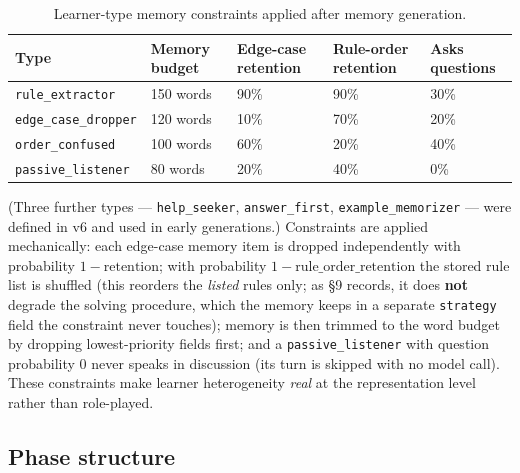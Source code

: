 \documentclass[11pt]{article}
\begin{document}
\begin{table}[h]
\centering
\caption{Learner-type memory constraints applied after memory generation.}
\label{tab:learner-types}
\begin{tabular}{@{}lp{2.0cm}p{2.3cm}p{2.3cm}p{1.9cm}@{}}
\toprule
Type & Memory budget & Edge-case retention & Rule-order retention & Asks questions \\
\midrule
\texttt{rule\_extractor}    & 150 words & 90\% & 90\% & 30\% \\
\texttt{edge\_case\_dropper} & 120 words & 10\% & 70\% & 20\% \\
\texttt{order\_confused}     & 100 words & 60\% & 20\% & 40\% \\
\texttt{passive\_listener}   &  80 words & 20\% & 40\% &  0\% \\
\bottomrule
\end{tabular}
\end{table}

(Three further types --- \texttt{help\_seeker}, \texttt{answer\_first},
\texttt{example\_memorizer} --- were defined in v6 and used in early generations.)
Constraints are applied mechanically: each edge-case memory item is dropped
independently with probability $1 - \text{retention}$; with probability $1 -
\text{rule\_order\_retention}$ the stored rule list is shuffled (this reorders the
\emph{listed} rules only; as \S9 records, it does \textbf{not} degrade the solving
procedure, which the memory keeps in a separate \texttt{strategy} field the
constraint never touches); memory is then trimmed to the word budget by dropping
lowest-priority fields first; and a \texttt{passive\_listener} with question
probability 0 never speaks in discussion (its turn is skipped with no model call).
These constraints make learner heterogeneity \emph{real} at the representation level
rather than role-played.

\subsection{Phase structure}
\end{document}
